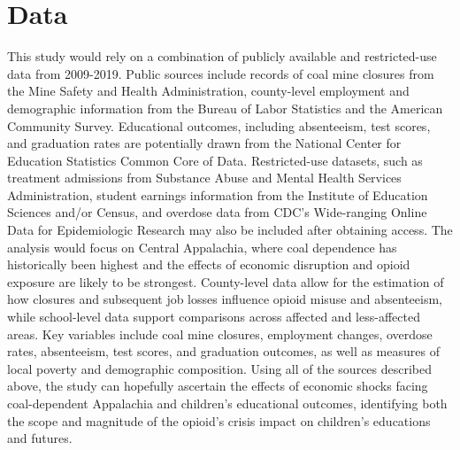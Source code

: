 \section*{Data}
This study would rely on a combination of publicly available and restricted-use data from 2009-2019. Public sources include records of coal mine closures from the Mine Safety and Health Administration, county-level employment and demographic information from the Bureau of Labor Statistics and the American Community Survey. Educational outcomes, including absenteeism, test scores, and graduation rates are potentially drawn from the National Center for Education Statistics Common Core of Data. Restricted-use datasets, such as treatment admissions from Substance Abuse and Mental Health Services Administration, student earnings information from the Institute of Education Sciences and/or Census, and overdose data from CDC's Wide-ranging Online Data for Epidemiologic Research may also be included after obtaining access. The analysis would focus on Central Appalachia, where coal dependence has historically been highest and the effects of economic disruption and opioid exposure are likely to be strongest. County-level data allow for the estimation of how closures and subsequent job losses influence opioid misuse and absenteeism, while school-level data support comparisons across affected and less-affected areas. Key variables include coal mine closures, employment changes, overdose rates, absenteeism, test scores, and graduation outcomes, as well as measures of local poverty and demographic composition. Using all of the sources described above, the study can hopefully ascertain the effects of economic shocks facing coal-dependent Appalachia and children's educational outcomes, identifying both the scope and magnitude of the opioid's crisis impact on children's educations and futures.

 



